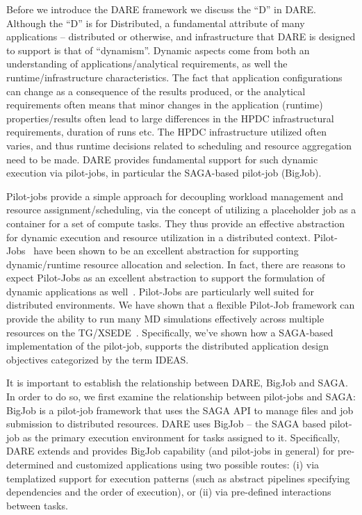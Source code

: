 \documentclass[]{svjour3}
\begin{document}
Before we introduce the DARE framework we discuss the ``D'' in
DARE. Although the ``D'' is for Distributed, a fundamental attribute
of many applications -- distributed or otherwise, and infrastructure
that DARE is designed to support is that of ``dynamism''.  Dynamic
aspects come from both an understanding of applications/analytical
requirements, as well the runtime/infrastructure characteristics.  The
fact that application configurations can change as a consequence of
the results produced, or the analytical requirements often means that
minor changes in the application (runtime) properties/results often
lead to large differences in the HPDC infrastructural requirements,
duration of runs etc. The HPDC infrastructure utilized often varies,
and thus runtime decisions related to scheduling and resource
aggregation need to be made. DARE provides fundamental support for
such dynamic execution via pilot-jobs, in particular the SAGA-based
pilot-job (BigJob).


Pilot-jobs provide a simple approach for decoupling workload
management and resource assignment/scheduling, via the concept of
utilizing a placeholder job as a container for a set of compute tasks.
They thus provide an effective abstraction for dynamic execution and
resource utilization in a distributed context.
Pilot-Jobs~\cite{pstar11} have been shown to be an excellent
abstraction for supporting dynamic/runtime resource allocation and
selection.  In fact, there are reasons to expect Pilot-Jobs as an
excellent abstraction to support the formulation of dynamic
applications as well~\cite{pstar11}. Pilot-Jobs are particularly well
suited for distributed environments.  We have shown that a flexible
Pilot-Job framework can provide the ability to run many MD simulations
effectively across multiple resources on the
TG/XSEDE~\cite{saga-royalsoc,saga_bigjob_condor_cloud}.  Specifically,
we've shown how a SAGA-based implementation of the pilot-job, supports
the distributed application design objectives categorized by the term
IDEAS\cite{ideas}.

It is important to establish the relationship between DARE, BigJob and
SAGA.  In order to do so, we first examine the relationship between
pilot-jobs and SAGA: BigJob is a pilot-job framework that uses the
SAGA API to manage files and job submission to distributed
resources. DARE uses BigJob -- the SAGA based pilot-job as the primary
execution environment for tasks assigned to it. Specifically, DARE
extends and provides BigJob capability (and pilot-jobs in general) for
pre-determined and customized applications using two possible routes:
(i) via templatized support for execution patterns (such as
abstract pipelines specifying dependencies and the order of
execution), or (ii) via pre-defined interactions between tasks.
 
\end{document}
